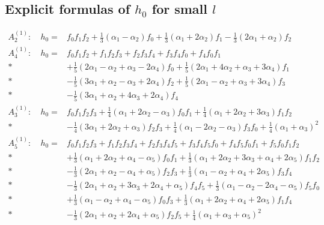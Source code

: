 \subsection{Explicit formulas of $h_0$ for small $l$}
\allowdisplaybreaks
\begin{eqnarray*}
A^{(1)}_2:\ & h_0= & 
f_0f_1f_2+\frac{1}{3}(\alpha_1-\alpha_2)f_0+
\frac{1}{3}(\alpha_1+2\alpha_2)f_1-\frac{1}{3}(2\alpha_1+\alpha_2) f_2\\
A^{(1)}_4:\ & h_0= & 
f_0f_1f_2+f_1f_2f_3+f_2f_3f_4+f_3f_4f_0+f_4f_0f_1\\*
&&
+\frac{1}{5}(2\alpha_1-\alpha_2+\alpha_3-2\alpha_4)f_0
+\frac{1}{5}(2\alpha_1+4\alpha_2+\alpha_3+3\alpha_4)f_1\\*
&&
-\frac{1}{5}(3\alpha_1+\alpha_2-\alpha_3+2\alpha_4)f_2
+\frac{1}{5}(2\alpha_1-\alpha_2+\alpha_3+3\alpha_4)f_3\\*
&&
-\frac{1}{5}(3\alpha_1+\alpha_2+4\alpha_3+2\alpha_4)f_4\\
A^{(1)}_3:\ & h_0= & 
f_0f_1f_2f_3
+\frac{1}{4}(\alpha_1+2\alpha_2-\alpha_3)f_0f_1
+\frac{1}{4}(\alpha_1+2\alpha_2+3\alpha_3)f_1f_2\\*
&&
-\frac{1}{4}(3\alpha_1+2\alpha_2+\alpha_3)f_2f_3
+\frac{1}{4}(\alpha_1-2\alpha_2-\alpha_3)f_3f_0
+\frac{1}{4}(\alpha_1+\alpha_3)^2\\
A^{(1)}_5:\ & h_0= & 
f_0f_1f_2f_3+f_1f_2f_3f_4+f_2f_3f_4f_5+f_3f_4f_5f_0+f_4f_5f_0f_1+f_5f_0f_1f_2\\*
&&
+\frac{1}{3}(\alpha_1+2\alpha_2+\alpha_4-\alpha_5)f_0f_1
+\frac{1}{3}(\alpha_1+2\alpha_2+3\alpha_3+\alpha_4+2\alpha_5)f_1f_2\\*
&&
-\frac{1}{3}(2\alpha_1+\alpha_2-\alpha_4+\alpha_5)f_2f_3
+\frac{1}{3}(\alpha_1-\alpha_2+\alpha_4+2\alpha_5)f_3f_4\\*
&&
-\frac{1}{3}(2\alpha_1+\alpha_2+3\alpha_3+2\alpha_4+\alpha_5)f_4f_5
+\frac{1}{3}(\alpha_1-\alpha_2-2\alpha_4-\alpha_5)f_5f_0
\\*
&&
+\frac{1}{3}(\alpha_1-\alpha_2+\alpha_4-\alpha_5)f_0f_3
+\frac{1}{3}(\alpha_1+2\alpha_2+\alpha_4+2\alpha_5)f_1f_4\\*
&&
-\frac{1}{3}(2\alpha_1+\alpha_2+2\alpha_4+\alpha_5)f_2f_5
+\frac{1}{4}(\alpha_1+\alpha_3+\alpha_5)^2
\end{eqnarray*}
 
